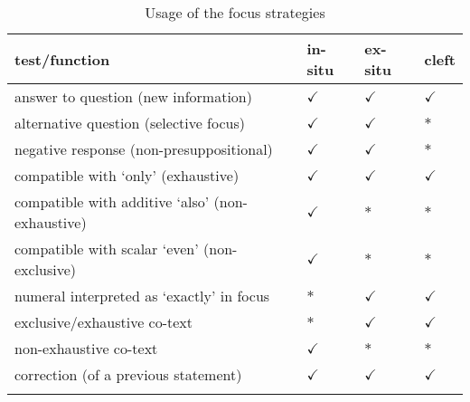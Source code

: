 \documentclass[output=paper,colorlinks,citecolor=brown]{langscibook}
\begin{document}
\begin{table}
    \begin{tabular}{llll}
    \lsptoprule
        test/function&in-situ&ex-situ&cleft \\
    \midrule
        { answer to question (new information)}&$\checkmark$&$\checkmark$&$\checkmark$\\
    \midrule
        alternative question  (selective focus)&{$\checkmark$}&$\checkmark$&{$\ast$}\\
    \midrule
        {  negative response  (non-presuppositional)}&$\checkmark$&$\checkmark$&$\ast$\\
    \midrule
        {  compatible with `only'   (exhaustive)}&$\checkmark$&$\checkmark$&$\checkmark$ \\
    \midrule
        {  compatible with additive `also' (non-exhaustive)}&$\checkmark$&$\ast$&$\ast$ \\
    \midrule
        { compatible with scalar `even' (non-exclusive)} &$\checkmark$&$\ast$&$\ast$ \\
    \midrule
        { numeral interpreted as `exactly' in focus}&$\ast$&$\checkmark$&$\checkmark$ \\
     \midrule
        {  exclusive/exhaustive co-text}&$\ast$&$\checkmark$&$\checkmark$\\
    \midrule
        { non-exhaustive co-text}&$\checkmark$&$\ast$&$\ast$\\
     \midrule
        { correction (of a previous statement)}&$\checkmark$&$\checkmark$&$\checkmark$\\
    \lspbottomrule
\end{tabular}
    \caption{Usage of the focus strategies}
    \label{tab:amaechi:1}
\end{table}
\end{document}
